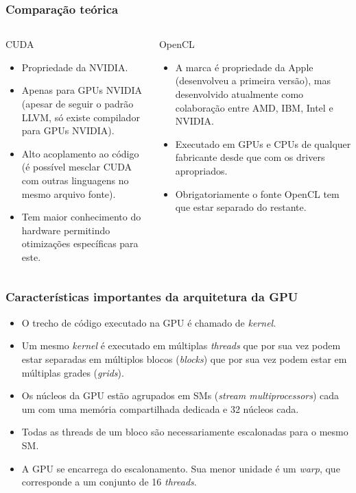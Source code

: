 \documentclass[brazil, 10pt]{beamer}
\begin{document}
\begin{frame}
  \frametitle{Comparação teórica}

\begin{columns}
  \begin{column}{.5\textwidth}
    CUDA
    
    \begin{itemize}
      \item Propriedade da NVIDIA.
      \item Apenas para GPUs NVIDIA (apesar de seguir o padrão LLVM, só existe compilador para GPUs NVIDIA).
      \item Alto acoplamento ao código (é possível mesclar CUDA com outras linguagens no mesmo arquivo fonte).
      \item Tem maior conhecimento do hardware permitindo otimizações específicas para este.
    \end{itemize}
  \end{column}
  \begin{column}{.5\textwidth}
    OpenCL    
    
    \begin{itemize}
      \item A marca é propriedade da Apple (desenvolveu a primeira versão), mas desenvolvido atualmente como colaboração entre AMD, IBM, Intel e NVIDIA.
      \item Executado em GPUs e CPUs de qualquer fabricante desde que com os drivers apropriados.
      \item Obrigatoriamente o fonte OpenCL tem que estar separado do restante.
    \end{itemize}
  \end{column}
\end{columns}
\end{frame}

\begin{frame}
  \frametitle{Características importantes da arquitetura da GPU}
  
  \begin{itemize}
    \item O trecho de código executado na GPU é chamado de \textit{kernel}.
    \item Um mesmo \textit{kernel} é executado em múltiplas \textit{threads} que por sua vez podem estar separadas em múltiplos blocos (\textit{blocks}) que por sua vez podem estar em múltiplas grades (\textit{grids}).
    \item Os núcleos da GPU estão agrupados em SMs (\textit{stream multiprocessors}) cada um com uma memória compartilhada dedicada e 32 núcleos cada.
    \item Todas as threads de um bloco são necessariamente escalonadas para o mesmo SM.
    \item A GPU se encarrega do escalonamento. Sua menor unidade é um \textit{warp}, que corresponde a um conjunto de 16 \textit{threads}.
  \end{itemize}
\end{frame}
\end{document}
